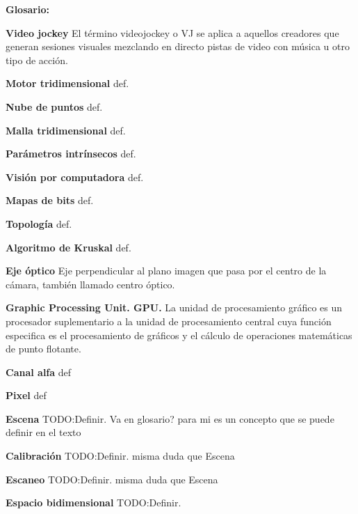 ﻿\Huge
\textbf{Glosario:}





\normalsize 
\textbf{Video jockey}
 El término videojockey o VJ se aplica a aquellos creadores que generan sesiones visuales mezclando en directo pistas de video con música u otro tipo de acción.


\textbf{Motor tridimensional}
 def.

 
\textbf{Nube de puntos}
 def.


\textbf{Malla tridimensional}
def.


\textbf{Parámetros intrínsecos}
def.


\textbf{Visión por computadora}
def.

 
\textbf{Mapas de bits}
def.


\textbf{Topología}
 def.

 
\textbf{Algoritmo de Kruskal}
 def.
  
  
\textbf{Eje óptico} 
 Eje perpendicular al plano imagen que pasa por el centro de la cámara, también llamado centro óptico.
 
 
\textbf{Graphic Processing Unit. GPU.}
 La unidad de procesamiento gráfico es un procesador suplementario a la unidad de procesamiento central cuya función especifica es el procesamiento de gráficos y el cálculo de operaciones matemáticas de punto flotante.

 
\textbf{Canal alfa}
 def 

 
\textbf{Pixel}
def
 
 
 


\textbf{Escena}
 TODO:Definir. Va en glosario? para mi es un concepto que se puede definir en el texto

 
\textbf{Calibración}
 TODO:Definir. misma duda que Escena

 
\textbf{Escaneo}
 TODO:Definir. misma duda que Escena

 
\textbf{Espacio bidimensional}
 TODO:Definir.

 


 


 


